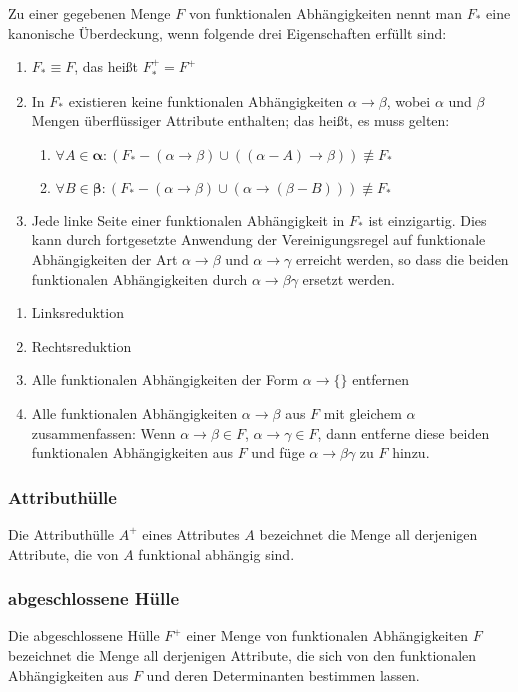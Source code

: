 Zu einer gegebenen Menge $F$ von funktionalen Abhängigkeiten nennt man $F_*$ eine kanonische Überdeckung, wenn folgende drei Eigenschaften erfüllt sind:
\begin{enumerate}
\item $F_* \equiv F$, das heißt $F_*^+ = F^+$
\item In $F_*$ existieren keine funktionalen Abhängigkeiten $\alpha \rightarrow \beta$, wobei $\alpha$ und $\beta$ Mengen überflüssiger Attribute enthalten; das heißt, es muss gelten:
\begin{enumerate}
\item $\forall A \in \mathbf \alpha: (F_* - (\alpha \rightarrow \beta) \cup ((\alpha - A) \rightarrow \beta)) \not\equiv F_*$
\item $\forall B \in \mathbf \beta: (F_*- (\alpha \rightarrow \beta) \cup (\alpha \rightarrow (\beta-B))) \not\equiv F_*$
\end{enumerate}
\item Jede linke Seite einer funktionalen Abhängigkeit in $F_*$ ist einzigartig. Dies kann durch fortgesetzte Anwendung der Vereinigungsregel auf funktionale Abhängigkeiten der Art $\alpha \rightarrow \beta$ und $\alpha \rightarrow \gamma$ erreicht werden, so dass die beiden funktionalen Abhängigkeiten durch $\alpha \rightarrow \beta\gamma$ ersetzt werden.
\end{enumerate}

\begin{enumerate}
\item Linksreduktion
\item Rechtsreduktion
\item Alle funktionalen Abhängigkeiten der Form $\alpha \rightarrow \{\}$ entfernen
\item Alle funktionalen Abhängigkeiten $\alpha \rightarrow \beta$ aus $F$ mit gleichem $\alpha$ zusammenfassen: Wenn $\alpha \rightarrow \beta \in F$, $\alpha \rightarrow \gamma \in F$, dann entferne diese beiden funktionalen Abhängigkeiten aus $F$ und füge $\alpha \rightarrow \beta\gamma$ zu $F$ hinzu.
\end{enumerate}

\subsubsection{Attributhülle}
Die Attributhülle $A^+$ eines Attributes $A$ bezeichnet die Menge all derjenigen Attribute, die von $A$ funktional abhängig sind.

\subsubsection{abgeschlossene Hülle}
Die abgeschlossene Hülle $F^+$ einer Menge von funktionalen Abhängigkeiten $F$ bezeichnet die Menge all derjenigen Attribute, die sich von den funktionalen Abhängigkeiten aus $F$ und deren Determinanten bestimmen lassen.

